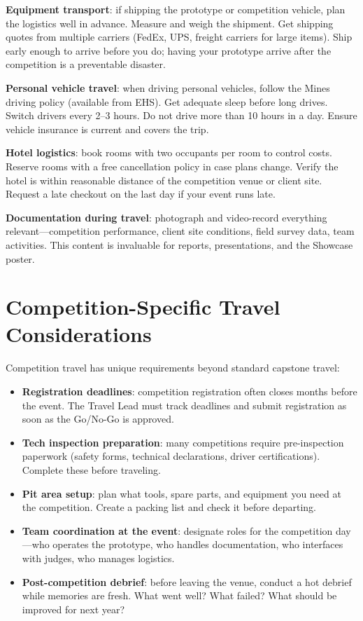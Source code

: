 \textbf{Equipment transport}: if shipping the prototype or competition vehicle, plan the logistics well in advance. Measure and weigh the shipment. Get shipping quotes from multiple carriers (FedEx, UPS, freight carriers for large items). Ship early enough to arrive before you do; having your prototype arrive after the competition is a preventable disaster.

\textbf{Personal vehicle travel}: when driving personal vehicles, follow the Mines driving policy (available from EHS). Get adequate sleep before long drives. Switch drivers every 2--3 hours. Do not drive more than 10 hours in a day. Ensure vehicle insurance is current and covers the trip.

\textbf{Hotel logistics}: book rooms with two occupants per room to control costs. Reserve rooms with a free cancellation policy in case plans change. Verify the hotel is within reasonable distance of the competition venue or client site. Request a late checkout on the last day if your event runs late.

\textbf{Documentation during travel}: photograph and video-record everything relevant---competition performance, client site conditions, field survey data, team activities. This content is invaluable for reports, presentations, and the Showcase poster.

\section{Competition-Specific Travel Considerations}
Competition travel has unique requirements beyond standard capstone travel:

\begin{itemize}[nosep,leftmargin=1.5em]
\item \textbf{Registration deadlines}: competition registration often closes months before the event. The Travel Lead must track deadlines and submit registration as soon as the Go/No-Go is approved.
\item \textbf{Tech inspection preparation}: many competitions require pre-inspection paperwork (safety forms, technical declarations, driver certifications). Complete these before traveling.
\item \textbf{Pit area setup}: plan what tools, spare parts, and equipment you need at the competition. Create a packing list and check it before departing.
\item \textbf{Team coordination at the event}: designate roles for the competition day---who operates the prototype, who handles documentation, who interfaces with judges, who manages logistics.
\item \textbf{Post-competition debrief}: before leaving the venue, conduct a hot debrief while memories are fresh. What went well? What failed? What should be improved for next year?
\end{itemize}



